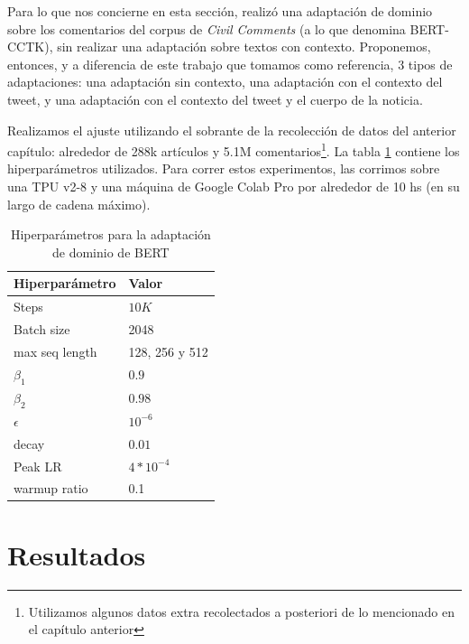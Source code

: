 Para lo que nos concierne en esta sección, \citet{pavlopoulos2020toxicity} realizó una adaptación de dominio sobre los comentarios del corpus de \emph{Civil Comments} (a lo que denomina BERT-CCTK), sin realizar una adaptación sobre textos con contexto. Proponemos, entonces, y a diferencia de este trabajo que tomamos como referencia, 3 tipos de adaptaciones: una adaptación sin contexto, una adaptación con el contexto del tweet, y una adaptación con el contexto del tweet y el cuerpo de la noticia.

Realizamos el ajuste utilizando el sobrante de la recolección de datos del anterior capítulo: alrededor de 288k artículos y 5.1M comentarios\footnote{Utilizamos algunos datos extra recolectados a posteriori de lo mencionado en el capítulo anterior}. La tabla \ref{tab:hs_ft_hyperparameter} contiene los hiperparámetros utilizados. Para correr estos experimentos, las corrimos sobre una TPU v2-8 y una máquina de Google Colab Pro por alrededor de 10 hs (en su largo de cadena máximo).

\begin{table}[t]
    \centering
    \begin{tabular}{ll}
        \toprule
        Hiperparámetro & Valor         \\
        \midrule
        Steps          & $10K$           \\
        Batch size     & 2048            \\
        max seq length & 128, 256 y 512  \\
        $\beta_1$      & $0.9$           \\
        $\beta_2$      & $0.98$          \\
        $\epsilon$     & $10^{-6}$       \\
        decay          & $0.01$          \\
        Peak LR        & $4*10^{-4}$     \\
        warmup ratio   & 0.1             \\
        \bottomrule
    \end{tabular}
    \caption{Hiperparámetros para la adaptación de dominio de BERT}
    \label{tab:hs_ft_hyperparameter}
\end{table}


\section{Resultados}


